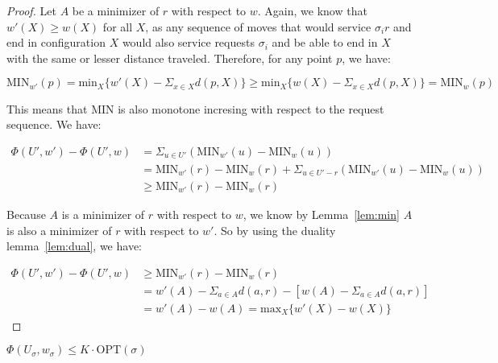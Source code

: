 \begin{proof}
    Let $A$ be a minimizer of $r$ with respect to $w$. Again, we know that $w'(X) \geq w(X)$ for all $X$, as any sequence of moves that would service $\sigma_i r$ and end in configuration $X$ would also service requests $\sigma_i$ and be able to end in $X$ with the same or lesser distance traveled. Therefore, for any point $p$, we have: 

    \begin{equation*}
        \mathrm{MIN}_{w'}(p) = \mathrm{min}_{X} \{w'(X) - \Sigma_{x \in X} d(p,X) \} \geq \mathrm{min}_{X} \{w(X) - \Sigma_{x \in X} d(p,X)  \} = \mathrm{MIN}_w(p)
    \end{equation*}

    This means that $\mathrm{MIN}$ is also monotone incresing with respect to the request sequence. We have:

    \begin{equation*}
        \begin{split}
            \Phi(U', w') - \Phi(U', w) &= \Sigma_{u \in U'} (\mathrm{MIN}_{w'}(u) - \mathrm{MIN}_w(u)) \\
            &= \mathrm{MIN}_{w'} (r) - \mathrm{MIN}_w(r) + \Sigma_{u \in U' - r} (\mathrm{MIN}_{w'} (u) - \mathrm{MIN}_w(u))\\
            &\geq \mathrm{MIN}_{w'} (r) - \mathrm{MIN}_w(r)
        \end{split}
    \end{equation*}

    Because $A$ is a minimizer of $r$ with respect to $w$, we know by Lemma~\ref{lem:min} $A$ is also a minimizer of $r$ with respect to $w'$. So by using the duality lemma~\ref{lem:dual}, we have:

    \begin{equation*}
        \begin{split}
            \Phi(U', w') - \Phi(U', w) &\geq \mathrm{MIN}_{w'} (r) - \mathrm{MIN}_w(r) \\
            &= w'(A) - \Sigma_{a \in A} d(a,r) - [w(A) - \Sigma_{a \in A} d(a,r)] \\
            &= w'(A) - w(A) = \mathrm{max}_X \{ w'(X) - w(X)\}
        \end{split}
    \end{equation*}
\end{proof}

\begin{lemma}
    \label{lem:er1}
    $\Phi(U_\sigma, w_\sigma) \leq K \cdot  \mathrm{OPT}(\sigma)$
\end{lemma}

